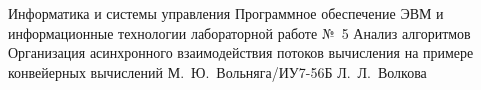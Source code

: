 \documentclass{bmstu}
\begin{document}
\makereporttitle
	{Информатика и системы управления} %
	{Программное обеспечение ЭВМ и информационные технологии} %
	{лабораторной работе №~5} %
	{Анализ алгоритмов} %
	{Организация асинхронного взаимодействия потоков вычисления на примере конвейерных вычислений} %
	{} %
	{М.~Ю.~Вольняга/ИУ7-56Б} %
	{Л.~Л.~Волкова} %
\maketableofcontents

%








\makebibliography
\end{document}
